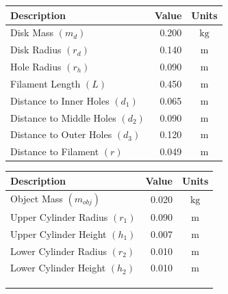 \documentclass[a4paper]{article}
\begin{document}
\begin{figure}[h]
	\centering
	\begin{minipage}{0.45\textwidth}
		\centering
		\small
		\begin{tabular}{lrc}
			\toprule
			Description & Value & Units \\
			\midrule
			Disk Mass $(m_d)$ & 0.200 & $\si{\kilogram}$\\
			Disk Radius $(r_d)$ & 0.140 & $\si{\meter}$ \\
			Hole Radius $(r_h)$ & 0.090 & $\si{\meter}$ \\
			Filament Length $(L)$ & 0.450 & $\si{\meter}$ \\
			Distance to Inner Holes $(d_1)$ & 0.065 & $\si{\meter}$\\
			Distance to Middle Holes $(d_2)$ & 0.090 & $\si{\meter}$\\
			Distance to Outer Holes $(d_3)$ & 0.120 & $\si{\meter}$\\
			Distance to Filament $(r)$ & 0.049 & $\si{\meter}$ \\
			\bottomrule
		\end{tabular}
	\end{minipage}
	\hspace{1cm}
	\begin{minipage}{0.45\textwidth}
		\centering
		\small
		\begin{tabular}{lrc}
			\toprule
			Description & Value & Units \\
			\midrule
			Object Mass $(m_{obj})$ & 0.020 & $\si{\kilogram}$ \\
			Upper Cylinder Radius $(r_1)$ & 0.090 & $\si{\meter}$ \\
			Upper Cylinder Height $(h_1)$ & 0.007 & $\si{\meter}$ \\
			Lower Cylinder Radius $(r_2)$ & 0.010 & $\si{\meter}$ \\
			Lower Cylinder Height $(h_2)$ & 0.010 & $\si{\meter}$ \\
			 & & \\
			 & & \\
			 & & \\
			\bottomrule
		\end{tabular}
	\end{minipage}
\end{figure}
\end{document}
